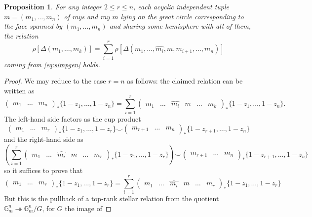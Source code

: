 \documentclass[10pt]{amsart}
\newtheorem{prop}[thm]{Proposition}
\theoremstyle{definition}
\numberwithin{equation}{section}
\begin{document}
    \begin{prop} \label{prop:gersrel}
    For any integer $2\le r \le n$, each acyclic independent tuple $\underline{m}=(m_1,\ldots, m_n)$ of rays and ray $m$ lying on the great circle corresponding to the face spanned by $(m_1,\ldots, m_n)$ and sharing some hemisphere with all of them, the relation
        \begin{equation}
        \rho[\Delta(m_1,\ldots, m_k)]=\sum_{i=1}^r \rho[\Delta(m_1,\ldots, \hat{m_i},m,m_{i+1},\ldots, m_n)]
        \end{equation}
    coming from \eqref{eq:simpgen} holds. 
    \end{prop}
    \begin{proof}
        We may reduce to the case $r=n$ as follows: the claimed relation can be written as 
        \[
        \begin{pmatrix}m_1&\ldots & m_n\end{pmatrix}_* \{1-z_1,\ldots, 1-z_n\} = \sum_{i=1}^r \begin{pmatrix}m_1&\ldots& \hat{m_i} & m & \ldots   & m_k\end{pmatrix}_* \{1-z_1,\ldots, 1-z_n\}.
        \]
        The left-hand side factors as the cup product
        \[
        \begin{pmatrix}m_1&\ldots & m_r\end{pmatrix}_* \{1-z_1,\ldots, 1-z_r\} \smile \begin{pmatrix}m_{r+1}&\ldots & m_n\end{pmatrix}_* \{1-z_{r+1},\ldots, 1-z_n\} 
        \]
        and the right-hand side as 
        \[
        \left(\sum_{i=1}^r \begin{pmatrix}m_1&\ldots& \hat{m_i} & m & \ldots   & m_r\end{pmatrix}_* \{1-z_1,\ldots, 1-z_r\}\right)
        \smile \begin{pmatrix}m_{r+1}&\ldots & m_n\end{pmatrix}_* \{1-z_{r+1},\ldots, 1-z_n\} 
        \]
        so it suffices to prove that 
        \[
        \begin{pmatrix}m_1&\ldots & m_r\end{pmatrix}_* \{1-z_1,\ldots, 1-z_r\} = \sum_{i=1}^r \begin{pmatrix}m_1&\ldots& \hat{m_i} & m & \ldots   & m_r\end{pmatrix}_* \{1-z_1,\ldots, 1-z_r\}
        \]
        But this is the pullback of a top-rank stellar relation from the quotient $\mathbb{G}_m^n\twoheadrightarrow \mathbb{G}_m^n/G$, for $G$ the image of 

\end{proof}
\end{document}
